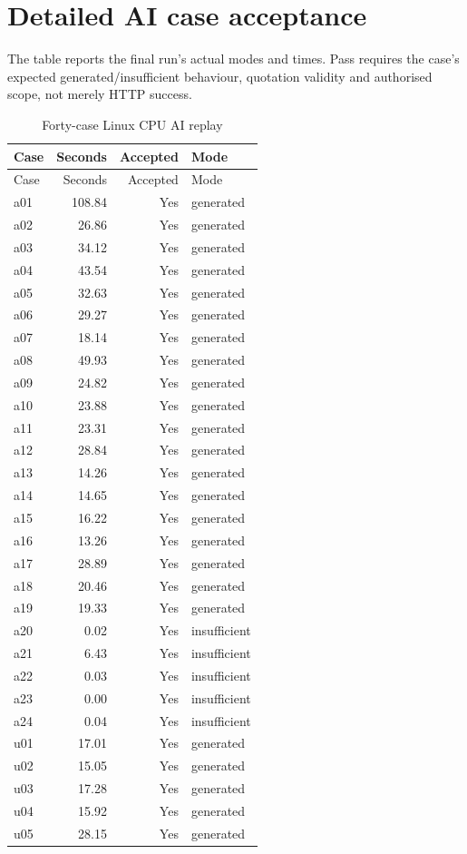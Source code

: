 \section{Detailed AI case acceptance}
The table reports the final run's actual modes and times. Pass requires the case's expected generated/insufficient behaviour, quotation validity and authorised scope, not merely HTTP success.
\begin{longtable}{lrrl}\caption{Forty-case Linux CPU AI replay}\\\toprule Case&Seconds&Accepted&Mode\\\midrule\endfirsthead\toprule Case&Seconds&Accepted&Mode\\\midrule\endhead
a01&108.84&Yes&generated\\
a02&26.86&Yes&generated\\
a03&34.12&Yes&generated\\
a04&43.54&Yes&generated\\
a05&32.63&Yes&generated\\
a06&29.27&Yes&generated\\
a07&18.14&Yes&generated\\
a08&49.93&Yes&generated\\
a09&24.82&Yes&generated\\
a10&23.88&Yes&generated\\
a11&23.31&Yes&generated\\
a12&28.84&Yes&generated\\
a13&14.26&Yes&generated\\
a14&14.65&Yes&generated\\
a15&16.22&Yes&generated\\
a16&13.26&Yes&generated\\
a17&28.89&Yes&generated\\
a18&20.46&Yes&generated\\
a19&19.33&Yes&generated\\
a20&0.02&Yes&insufficient\\
a21&6.43&Yes&insufficient\\
a22&0.03&Yes&insufficient\\
a23&0.00&Yes&insufficient\\
a24&0.04&Yes&insufficient\\
u01&17.01&Yes&generated\\
u02&15.05&Yes&generated\\
u03&17.28&Yes&generated\\
u04&15.92&Yes&generated\\
u05&28.15&Yes&generated\\

\end{longtable}
